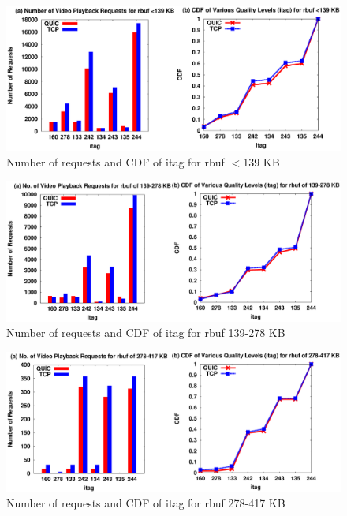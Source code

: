 \begin{figure}[!ht]
    \centering
    \includegraphics[width=0.9\linewidth]{img/CDF/plot_itag_142367}
    \caption{Number of requests and CDF of itag for rbuf $<$139 KB}
    \label{fig:itag761121}
\end{figure}

\begin{figure}[!ht]
    \centering
    \includegraphics[width=0.9\linewidth]{img/CDF/plot_itag_284734}
    \caption{Number of requests and CDF of itag for rbuf 139-278 KB}
    \label{fig:itag65526}
\end{figure}
\begin{figure}[!ht]
    \centering
    \includegraphics[width=0.9\linewidth]{img/CDF/plot_itag_427101}
    \caption{Number of requests and CDF of itag for rbuf 278-417 KB}
    \label{fig:itag7612}
\end{figure}

